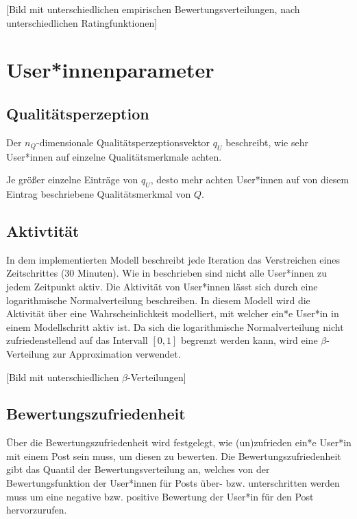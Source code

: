 
[Bild mit unterschiedlichen empirischen Bewertungsverteilungen, nach unterschiedlichen Ratingfunktionen]



\section{User*innenparameter}


\subsection{Qualitätsperzeption}
\label{uqualitaet}

Der $n_Q$-dimensionale Qualitätsperzeptionsvektor $q_U$ beschreibt, wie sehr User*innen auf einzelne Qualitätsmerkmale achten. 

Je größer einzelne Einträge von $q_U$, desto mehr achten User*innen auf von diesem Eintrag beschriebene Qualitätsmerkmal von $Q$.

\subsection{Aktivtität}

In dem implementierten Modell beschreibt jede Iteration das Verstreichen eines Zeitschrittes (30 Minuten). Wie in \cite{Hogg20121} beschrieben sind nicht alle User*innen zu jedem Zeitpunkt aktiv. Die Aktivität von User*innen lässt sich durch eine logarithmische Normalverteilung
beschreiben. In diesem Modell wird die Aktivität über eine Wahrscheinlichkeit modelliert,  mit welcher ein*e User*in in einem Modellschritt aktiv ist. Da sich die logarithmische Normalverteilung nicht zufriedenstellend auf das Intervall $ [0,1]$ begrenzt werden kann, wird eine $\beta$-Verteilung zur Approximation verwendet.

[Bild mit unterschiedlichen $\beta$-Verteilungen]

\subsection{Bewertungszufriedenheit}


Über die Bewertungszufriedenheit wird festgelegt, wie (un)zufrieden ein*e User*in mit einem Post sein muss, um diesen zu bewerten. 
Die Bewertungszufriedenheit gibt das Quantil der Bewertungsverteilung an, welches von der Bewertungsfunktion der User*innen für Posts über- bzw. unterschritten werden muss um eine negative bzw. positive Bewertung der User*in für den Post hervorzurufen.

